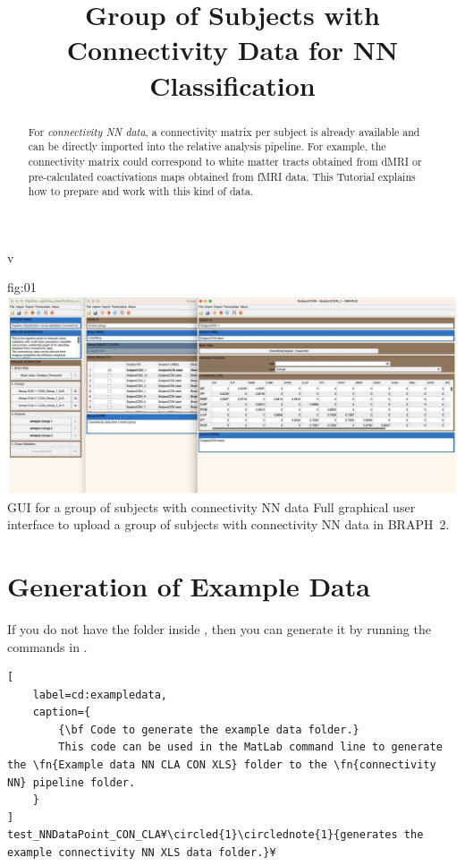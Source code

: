 v\documentclass[justified]{tufte-handout}
\title{Group of Subjects with Connectivity Data for NN Classification}
\begin{document}
\maketitle

\begin{abstract}
\noindent
For \emph{connectivity NN data}, a connectivity matrix per subject is already available and can be directly imported into the relative analysis pipeline. For example, the connectivity matrix could correspond to white matter tracts obtained from dMRI or pre-calculated coactivations maps obtained from fMRI data.
This Tutorial explains how to prepare and work with this kind of data.
\end{abstract}


\tableofcontents

	{fig:01}
	{\includegraphics{fig01.jpg}}
	{GUI for a group of subjects with connectivity NN data}
	{
	Full graphical user interface to upload a group of subjects with connectivity NN data in BRAPH~2. 
	}

\clearpage
\section{Generation of Example Data}

If you do not have the  folder inside , then you can generate it by running the commands in .
%
\begin{lstlisting}[
	label=cd:exampledata,
	caption={
		{\bf Code to generate the example data folder.}
		This code can be used in the MatLab command line to generate the \fn{Example data NN CLA CON XLS} folder to the \fn{connectivity NN} pipeline folder.
	}
]
test_NNDataPoint_CON_CLA¥\circled{1}\circlednote{1}{generates the example connectivity NN XLS data folder.}¥
\end{lstlisting}
\end{document}

